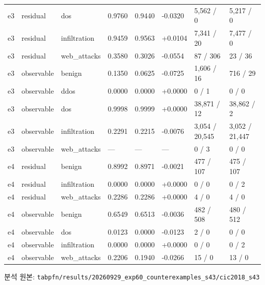 \begin{landscape}
\begin{longtable}
{}e3 & residual & dos & 0.9760 & 0.9440 & -0.0320 & 5,562 /\allowbreak{} 0 & 5,217 /\allowbreak{} 0 \\
{}e3 & residual & infiltration & 0.9459 & 0.9563 & +\allowbreak{}0.0104 & 7,341 /\allowbreak{} 20 & 7,477 /\allowbreak{} 0 \\
{}e3 & residual & web\_\allowbreak{}attacks & 0.3580 & 0.3026 & -0.0554 & 87 /\allowbreak{} 306 & 23 /\allowbreak{} 36 \\
{}e3 & observable & benign & 0.1350 & 0.0625 & -0.0725 & 1,606 /\allowbreak{} 16 & 716 /\allowbreak{} 29 \\
{}e3 & observable & ddos & 0.0000 & 0.0000 & +\allowbreak{}0.0000 & 0 /\allowbreak{} 1 & 0 /\allowbreak{} 0 \\
{}e3 & observable & dos & 0.9998 & 0.9999 & +\allowbreak{}0.0000 & 38,871 /\allowbreak{} 12 & 38,862 /\allowbreak{} 2 \\
{}e3 & observable & infiltration & 0.2291 & 0.2215 & -0.0076 & 3,054 /\allowbreak{} 20,545 & 3,052 /\allowbreak{} 21,447 \\
{}e3 & observable & web\_\allowbreak{}attacks & — & — & — & 0 /\allowbreak{} 3 & 0 /\allowbreak{} 0 \\
{}e4 & residual & benign & 0.8992 & 0.8971 & -0.0021 & 477 /\allowbreak{} 107 & 475 /\allowbreak{} 107 \\
{}e4 & residual & infiltration & 0.0000 & 0.0000 & +\allowbreak{}0.0000 & 0 /\allowbreak{} 0 & 0 /\allowbreak{} 2 \\
{}e4 & residual & web\_\allowbreak{}attacks & 0.2286 & 0.2286 & +\allowbreak{}0.0000 & 4 /\allowbreak{} 0 & 4 /\allowbreak{} 0 \\
{}e4 & observable & benign & 0.6549 & 0.6513 & -0.0036 & 482 /\allowbreak{} 508 & 480 /\allowbreak{} 512 \\
{}e4 & observable & dos & 0.0123 & 0.0000 & -0.0123 & 2 /\allowbreak{} 0 & 0 /\allowbreak{} 0 \\
{}e4 & observable & infiltration & 0.0000 & 0.0000 & +\allowbreak{}0.0000 & 0 /\allowbreak{} 0 & 0 /\allowbreak{} 2 \\
{}e4 & observable & web\_\allowbreak{}attacks & 0.2206 & 0.1940 & -0.0266 & 15 /\allowbreak{} 0 & 13 /\allowbreak{} 0 \\
\bottomrule
\end{longtable}
\endgroup
\end{landscape}
분석 원본: \texttt{tabpfn/\allowbreak{}\allowbreak{}r\allowbreak{}esults/\allowbreak{}\allowbreak{}2\allowbreak{}0260929\_\allowbreak{}\allowbreak{}exp60\_\allowbreak{}\allowbreak{}co\allowbreak{}unterexa\allowbreak{}mples\_\allowbreak{}\allowbreak{}s4\allowbreak{}3/\allowbreak{}\allowbreak{}cic201\allowbreak{}8\_\allowbreak{}\allowbreak{}s43}

